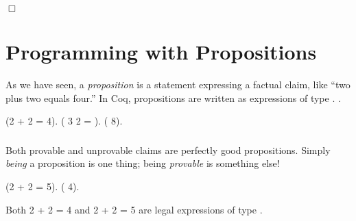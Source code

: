 \documentclass[12pt]{report}
\begin{document}
 \ensuremath{\Box} \begin{coqdoccode}
\coqdocemptyline
\end{coqdoccode}
\section{Programming with Propositions}



 As we have seen, a \textit{proposition} is a statement expressing a factual claim,
    like ``two plus two equals four.''  In Coq, propositions are written
    as expressions of type . . \begin{coqdoccode}
\coqdocemptyline
\coqdocnoindent
{} (2 + 2 = 4).\coqdoceol
\coqdocemptyline
\coqdocnoindent
{} ( 3 2 = ).\coqdoceol
\coqdocemptyline
\coqdocnoindent
{} ( 8).\coqdoceol
\coqdocemptyline
\end{coqdoccode}
\subsubsection{ }

 Both provable and unprovable claims are perfectly good
    propositions.  Simply \textit{being} a proposition is one thing; being
    \textit{provable} is something else! \begin{coqdoccode}
\coqdocemptyline
\coqdocnoindent
{} (2 + 2 = 5).\coqdoceol
\coqdocemptyline
\coqdocnoindent
{} ( 4).\coqdoceol
\coqdocemptyline
\end{coqdoccode}
Both 2 + 2 = 4 and 2 + 2 = 5 are legal expressions
    of type . 

\subsubsection{ }
\end{document}
